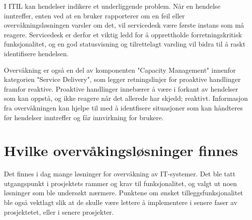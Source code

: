 I ITIL kan hendelser indikere et underliggende problem. Når en hendelse inntreffer, enten ved at en bruker rapporterer om en feil eller overvåkningsløsningen varsler om det, vil servicedesk være første instans som må reagere. Servicedesk er derfor et viktig ledd for å opprettholde forretningskritisk funksjonalitet, og en god statusvisning og tilrettelagt varsling vil bidra til å raskt identifisere hendelsen.

Overvåkning er også en del av komponenten "Capacity Management" innenfor kategorien "Service Delivery", som legger retningslinjer for proaktive handlinger framfor reaktive. Proaktive handlinger innebærer å være i forkant av hendelser som kan oppstå, og ikke reagere når det allerede har skjedd; reaktivt. Informasjon fra overvåkningen kan hjelpe til med å identfisere situasjoner som kan håndteres før hendelser inntreffer og får innvirkning for brukere. \cite{itil1} \cite{itil2} \cite{events}

\section{Hvilke overvåkingsløsninger finnes}\label{sec:hvilkefinnes}
Det finnes i dag mange løsninger for overvåkning av IT-systemer\cite{wiki:networkmonitoring}. Det ble tatt utgangspunkt i prosjektets rammer og krav til funksjonalitet, og valgt ut noen løsninger som ble undersøkt nærmere. Punktene om ønsket tilleggsfunksjonalitet ble også vektlagt slik at de skulle være lettere å implementere i senere faser av prosjektetet, eller i senere prosjekter. 

